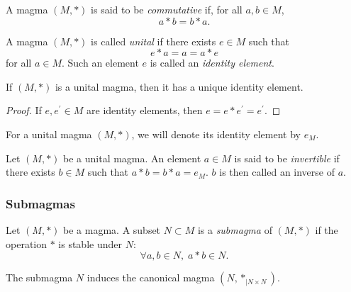 \documentclass[12pt]{report}
\begin{document}
\begin{definition} \label{def-magma-commutative}
    A magma $(M, \ast)$ is said to be \emph{commutative} if, for all $a, b \in M$,
    \[
        a \ast b = b \ast a.
    \]
    
\end{definition}

\begin{definition} \label{def-magma-id-element}
    A magma $(M, \ast)$ is called \emph{unital} if there exists $e \in M$ such that
    \[
        e \ast a = a = a \ast e
    \]  
    for all $a \in M$. Such an element $e$ is called an \emph{identity element}.
\end{definition}

\begin{theorem} \label{thm-magma-id-element-uniqueness}
    If $(M, \ast)$ is a unital magma, then it has a unique identity element.
\end{theorem}

\begin{proof}
    If $e, e^{\prime} \in M$ are identity elements, then $e = e \ast e^{\prime} = e^{\prime}$.
\end{proof}

\begin{notation}
    For a unital magma $(M, \ast)$, we will denote its identity element by $e_M$.
\end{notation}

\begin{definition} \label{def-magma-invertible-element}
    Let $(M, \ast)$ be a unital magma. An element $a \in M$ is said to be \emph{invertible} if there exists $b \in M$ such that $a \ast b = b \ast a = e_M$. $b$ is then called an inverse of $a$.
\end{definition}

\subsubsection{Submagmas}
\begin{definition} \label{def-magma-submagma}
    Let $(M, \ast)$ be a magma. A subset $N \subset M$ is a \emph{submagma} of $(M, \ast)$ if the operation $\ast$ is stable under $N$:
    \[
        \forall a, b \in N, \; a \ast b \in N.
    \]
\end{definition}

\begin{remark} \label{rem-magma-canonical-submagma}
    The submagma $N$ induces the canonical magma $(N, \ast_{\vert N \times N})$.
\end{remark}
\end{document}

